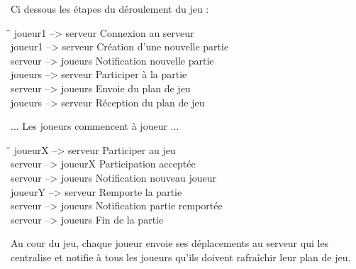 \par

Ci dessous les étapes du déroulement du jeu :

\begin{tabbing}
\hspace{2cm}\=\hspace{1cm}\=\hspace{2cm}\=\kill
 joueur1 \>  --> \>  serveur \> Connexion au serveur \\
 joueur1 \>  --> \>  serveur \> Création d'une nouvelle partie \\
 serveur \>  --> \>  joueurs \> Notification nouvelle partie \\
 joueurs \>  --> \>  serveur \> Participer à la partie \\
 serveur \>  --> \>  joueurs \> Envoie du plan de jeu \\ 
 joueurs \>  --> \>  serveur \> Réception du plan de jeu \\
\end{tabbing} 

 ... Les joueurs commencent à joueur ... \\

\begin{tabbing}
\hspace{2cm}\=\hspace{1cm}\=\hspace{2cm}\=\kill
 joueurX \>  --> \>  serveur \> Participer au jeu \\
 serveur \>  --> \>  joueurX \> Participation acceptée \\
 serveur \>  --> \>  joueurs \> Notification nouveau joueur \\
 joueurY \>  --> \>  serveur \> Remporte la partie \\
 serveur \>  --> \>  joueurs \> Notification partie remportée \\ 
 serveur \>  --> \>  joueurs \> Fin de la partie \\
\end{tabbing}

Au cour du jeu, chaque joueur envoie ses déplacements au serveur qui les centralise et notifie à tous les joueurs qu'ils doivent rafraîchir leur plan de jeu. \\